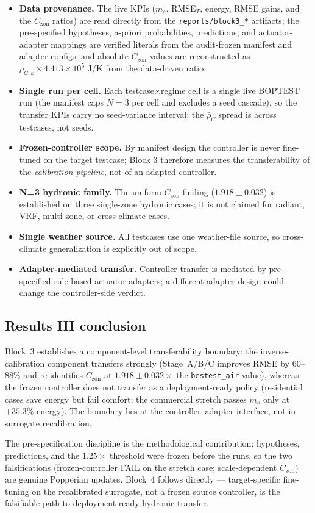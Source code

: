 \documentclass[11pt,a4paper]{article}
\begin{document}
\begin{itemize}
  \item \textbf{Data provenance.} The live KPIs ($m_s$, RMSE$_T$, energy, RMSE gains, and the $C_{\mathrm{zon}}$ ratios) are read directly from the \texttt{reports/block3\_*} artifacts; the pre-specified hypotheses, a-priori probabilities, predictions, and actuator-adapter mappings are verified literals from the audit-frozen manifest and adapter configs; and absolute $C_{\mathrm{zon}}$ values are reconstructed as $\rho_{C,k}\times 4.413\times10^5$ J/K from the data-driven ratio.
  \item \textbf{Single run per cell.} Each testcase$\times$regime cell is a single live BOPTEST run (the manifest caps $N=3$ per cell and excludes a seed cascade), so the transfer KPIs carry no seed-variance interval; the $\bar\rho_C$ spread is across testcases, not seeds.
  \item \textbf{Frozen-controller scope.} By manifest design the controller is never fine-tuned on the target testcase; Block 3 therefore measures the transferability of the \emph{calibration pipeline}, not of an adapted controller.
  \item \textbf{N=3 hydronic family.} The uniform-$C_{\mathrm{zon}}$ finding ($1.918\pm0.032$) is established on three single-zone hydronic cases; it is not claimed for radiant, VRF, multi-zone, or cross-climate cases.
  \item \textbf{Single weather source.} All testcases use one weather-file source, so cross-climate generalization is explicitly out of scope.
  \item \textbf{Adapter-mediated transfer.} Controller transfer is mediated by pre-specified rule-based actuator adapters; a different adapter design could change the controller-side verdict.
\end{itemize}

\subsection{Results III conclusion}

Block~3 establishes a component-level transferability boundary: the inverse-calibration component transfers strongly (Stage~A/B/C improves RMSE by $60$--$88\%$ and re-identifies $C_{\mathrm{zon}}$ at $1.918\pm0.032\times$ the \texttt{bestest\_air} value), whereas the frozen controller does not transfer as a deployment-ready policy (residential cases save energy but fail comfort; the commercial stretch passes $m_s$ only at $+35.3\%$ energy). The boundary lies at the controller--adapter interface, not in surrogate recalibration.

The pre-specification discipline is the methodological contribution: hypotheses, predictions, and the $1.25\times$ threshold were frozen before the runs, so the two falsifications (frozen-controller FAIL on the stretch case; scale-dependent $C_{\mathrm{zon}}$) are genuine Popperian updates. Block~4 follows directly --- target-specific fine-tuning on the recalibrated surrogate, not a frozen source controller, is the falsifiable path to deployment-ready hydronic transfer.
\end{document}
